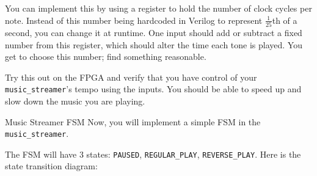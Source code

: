\documentclass[11pt]{article}
\makeatletter
\renewcommand{\section}
{\@startsection {section}{1}{0pt}
 {-2ex}
 {1ex}
 {\bfseries\Large}}
\makeatother
\begin{document}
You can implement this by using a register to hold the number of clock cycles per note. Instead of this number being hardcoded in Verilog to represent $\frac{1}{25}$th of a second, you can change it at runtime. One input should add or subtract a fixed number from this register, which should alter the time each tone is played. You get to choose this number; find something reasonable.

Try this out on the FPGA and verify that you have control of your \verb|music_streamer|'s tempo using the inputs. You should be able to speed up and slow down the music you are playing.

\section{Music Streamer FSM}
Now, you will implement a simple FSM in the \verb|music_streamer|.

The FSM will have 3 states: \verb|PAUSED|, \verb|REGULAR_PLAY|, \verb|REVERSE_PLAY|. Here is the state transition diagram:

\begin{center}
\end{center}
\end{document}
